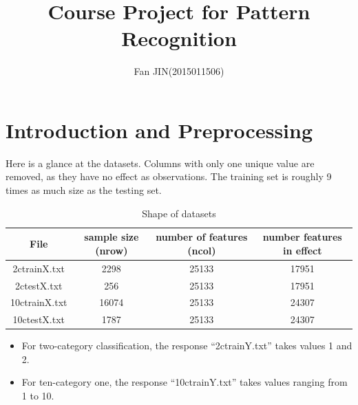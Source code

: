 \documentclass{article}
\begin{document}
\title{\textsf{Course Project for Pattern Recognition}}
\author{Fan JIN\quad (2015011506)}
\maketitle

\tableofcontents
\clearpage

\section{Introduction and Preprocessing}
{
    Here is a glance at the datasets. 
    Columns with only one unique value are removed, as they have no effect as observations.
    The training set is roughly 9 times as much size as the testing set.

    \begin{table}[!hbp]
        \centering
        \begin{tabular}{|c|c|c|c|}
        \hline
        File & sample size (nrow) & number of features (ncol) & number features in effect \\
        \hline
        2ctrainX.txt & 2298 & 25133 & 17951 \\
        \hline
        2ctestX.txt & 256 & 25133 & 17951 \\
        \hline
        10ctrainX.txt & 16074 & 25133 & 24307 \\
        \hline
        10ctestX.txt & 1787 & 25133 & 24307 \\
        \hline
        \end{tabular}
        \caption{Shape of datasets}
    \end{table}

    \begin{itemize}
        \item For two-category classification, the response ``2ctrainY.txt'' takes values 1 and 2.
        \item For ten-category one, the response ``10ctrainY.txt'' takes values ranging from 1 to 10.
    \end{itemize}
}
\end{document}
